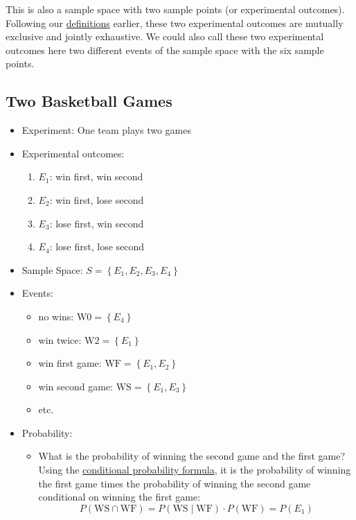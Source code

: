 \documentclass[
]{book}
\providecommand{\tightlist}{%
  \setlength{\itemsep}{0pt}\setlength{\parskip}{0pt}}
\begin{document}
This is also a sample space with two sample points (or experimental outcomes). Following our \href{https://fanwangecon.github.io/Stat4Econ/probability/htmlpdfr/samplespace.html}{definitions} earlier, these two experimental outcomes are mutually exclusive and jointly exhaustive. We could also call these two experimental outcomes here two different events of the sample space with the six sample points.

\hypertarget{two-basketball-games}{%
\subsection{Two Basketball Games}\label{two-basketball-games}}

\begin{itemize}
\tightlist
\item
  Experiment: One team plays two games
\item
  Experimental outcomes:

  \begin{enumerate}
  \def\labelenumi{\arabic{enumi}.}
  \tightlist
  \item
    \(E_1\): win first, win second
  \item
    \(E_2\): win first, lose second
  \item
    \(E_3\): lose first, win second
  \item
    \(E_4\): lose first, lose second
  \end{enumerate}
\item
  Sample Space: \(S=\left\{E_1, E_2, E_3, E_4\right\}\)
\item
  Events:

  \begin{itemize}
  \tightlist
  \item
    no wins: \(\text{W0} = \left\{E_4\right\}\)
  \item
    win twice: \(\text{W2} = \left\{E_1\right\}\)
  \item
    win first game: \(\text{WF} = \left\{E_1, E_2\right\}\)
  \item
    win second game: \(\text{WS} = \left\{E_1, E_3\right\}\)
  \item
    etc.
  \end{itemize}
\item
  Probability:

  \begin{itemize}
  \tightlist
  \item
    What is the probability of winning the second game and the first game? Using the \href{https://fanwangecon.github.io/Stat4Econ/probability/htmlpdfr/samplespace.html}{conditional probability formula}, it is the probability of winning the first game times the probability of winning the second game conditional on winning the first game:
    \[P(\text{WS} \cap \text{WF}) = P(\text{WS} \mid \text{WF}) \cdot P(\text{WF}) = P(E_1)\]


\end{itemize}
\end{itemize}
\end{document}
